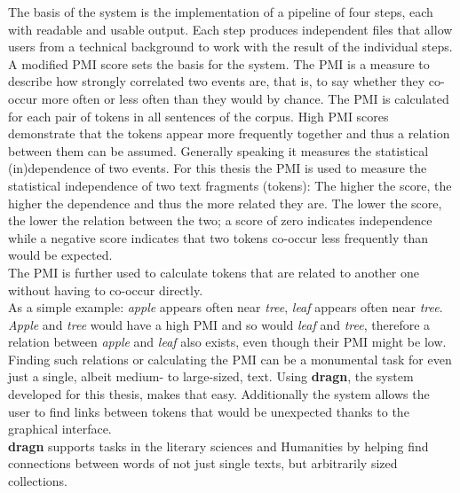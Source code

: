 The basis of the system is the implementation of a pipeline of four steps, each with readable and usable output. Each step produces independent files that allow users from a technical background to work with the result of the individual steps.\\
A modified PMI score sets the basis for the system. The PMI is a measure to describe how strongly correlated two events are, that is, to say whether they co-occur more often or less often than they would by chance. The PMI is calculated for each pair of tokens in all sentences of the corpus. High PMI scores demonstrate that the tokens appear more frequently together and thus a relation between them can be assumed. Generally speaking it measures the statistical (in)dependence of two events. For this thesis the PMI is used to measure the statistical independence of two text fragments (tokens): The higher the score, the higher the dependence and thus the more related they are. The lower the score, the lower the relation between the two; a score of zero indicates independence while a negative score indicates that two tokens co-occur less frequently than would be expected.\\
The PMI is further used to calculate tokens that are related to another one without having to co-occur directly.\\
As a simple example: \textit{apple} appears often near \textit{tree}, \textit{leaf} appears often near \textit{tree}. \textit{Apple} and \textit{tree} would have a high PMI and so would \textit{leaf} and \textit{tree}, therefore a relation between \textit{apple} and \textit{leaf} also exists, even though their PMI might be low.\\
Finding such relations or calculating the PMI can be a monumental task for even just a single, albeit medium- to large-sized, text. Using \textbf{dragn}, the system developed for this thesis, makes that easy. Additionally the system allows the user to find links between tokens that would be unexpected thanks to the graphical interface.\\
\textbf{dragn} supports tasks in the literary sciences and Humanities by helping find connections between words of not just single texts, but arbitrarily sized collections.

